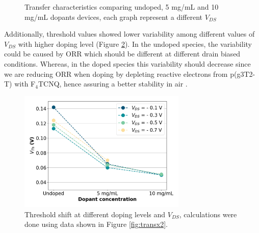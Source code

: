 \begin{figure}[ht]
    \caption[Transfer characteristics comparing different doping levels]{Transfer characteristics comparing undoped, 5 mg/mL and 10 mg/mL dopants devices, each graph represent a different $V_{DS}$}
    \label{fig:shift1}
\end{figure}

Additionally, threshold values showed lower variability among different values of $V_{DS}$ with higher doping level (Figure \ref{fig:vth_vds}). In the undoped species, the variability could be caused by ORR which should be different at different drain biased conditions. Whereas, in the doped species this variability should decrease since we are reducing ORR when doping by depleting reactive electrons from p(g3T2-T) with F$_{4}$TCNQ, hence assuring a better stability in air \cite{tanTuningOrganicElectrochemical2022}. %

\begin{figure}[ht]
  \centering
  \includegraphics[width=8cm]{Images/pdf/vth_shift_vds.pdf}
  \caption[Threshold shift at different doping levels and $V_{DS}$]{Threshold shift at different doping levels and $V_{DS}$, calculations were done using data shown in Figure \ref{fig:transx2}.}
  \label{fig:vth_vds}
\end{figure}

